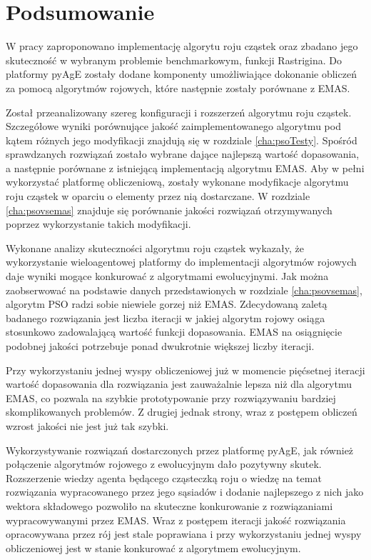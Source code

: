 \chapter{Podsumowanie}
\label{cha:podsumowanie}

W pracy zaproponowano implementację algorytu roju cząstek oraz zbadano jego skuteczność w wybranym problemie benchmarkowym, funkcji Rastrigina. Do platformy pyAgE zostały dodane komponenty umożliwiające dokonanie obliczeń za pomocą algorytmów rojowych, które następnie zostały porównane z EMAS.

Został przeanalizowany szereg konfiguracji i rozszerzeń algorytmu roju cząstek. Szczegółowe wyniki porównujące jakość zaimplementowanego algorytmu pod kątem różnych jego modyfikacji znajdują się w rozdziale \ref{cha:psoTesty}. Spośród sprawdzanych rozwiązań zostało wybrane dające najlepszą wartość dopasowania, a następnie porównane z istniejącą implementacją algorytmu EMAS. Aby w pełni wykorzystać platformę obliczeniową, zostały wykonane modyfikacje algorytmu roju cząstek w oparciu o elementy przez nią dostarczane. W rozdziale \ref{cha:psovsemas} znajduje się porównanie jakości rozwiązań otrzymywanych poprzez wykorzystanie takich modyfikacji.

Wykonane analizy skuteczności algorytmu roju cząstek wykazały, że wykorzystanie wieloagentowej platformy do implementacji algorytmów rojowych daje wyniki mogące konkurować z algorytmami ewolucyjnymi. Jak można zaobserwować na podstawie danych przedstawionych w rozdziale \ref{cha:psovsemas}, algorytm PSO radzi sobie niewiele gorzej niż EMAS. Zdecydowaną zaletą badanego rozwiązania jest liczba iteracji w jakiej algorytm rojowy osiąga stosunkowo zadowalającą wartość funkcji dopasowania. EMAS na osiągnięcie podobnej jakości potrzebuje ponad dwukrotnie większej liczby iteracji.

Przy wykorzystaniu jednej wyspy obliczeniowej już w momencie pięćsetnej iteracji wartość dopasowania dla rozwiązania jest zauważalnie lepsza niż dla algorytmu EMAS, co pozwala na szybkie prototypowanie przy rozwiązywaniu bardziej skomplikowanych problemów. Z drugiej jednak strony, wraz z postępem obliczeń wzrost jakości nie jest już tak szybki.

Wykorzystywanie rozwiązań dostarczonych przez platformę pyAgE, jak również połączenie algorytmów rojowego z ewolucyjnym dało pozytywny skutek. Rozszerzenie wiedzy agenta będącego cząsteczką roju o wiedzę na temat rozwiązania wypracowanego przez jego sąsiadów i dodanie najlepszego z nich jako wektora składowego pozwoliło na skuteczne konkurowanie z rozwiązaniami wypracowywanymi przez EMAS. Wraz z postępem iteracji jakość rozwiązania opracowywana przez rój jest stale poprawiana i przy wykorzystaniu jednej wyspy obliczeniowej jest w stanie konkurować z algorytmem ewolucyjnym.

